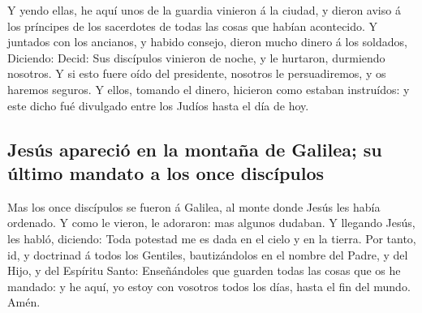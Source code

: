  Y yendo ellas, he aquí unos de la guardia vinieron á la
ciudad, y dieron aviso á los príncipes de los sacerdotes de todas las
cosas que habían acontecido.  Y juntados con los
ancianos, y habido consejo, dieron mucho dinero á los soldados,
 Diciendo: Decid: Sus discípulos vinieron de noche, y le
hurtaron, durmiendo nosotros.  Y si esto fuere oído del
presidente, nosotros le persuadiremos, y os haremos seguros.
 Y ellos, tomando el dinero, hicieron como estaban
instruídos: y este dicho fué divulgado entre los Judíos hasta el día de
hoy.

\hypertarget{jesuxfas-apareciuxf3-en-la-montauxf1a-de-galilea-su-uxfaltimo-mandato-a-los-once-discuxedpulos}{%
\subsection{Jesús apareció en la montaña de Galilea; su último mandato a
los once
discípulos}\label{jesuxfas-apareciuxf3-en-la-montauxf1a-de-galilea-su-uxfaltimo-mandato-a-los-once-discuxedpulos}}

 Mas los once discípulos se fueron á Galilea, al monte
donde Jesús les había ordenado.  Y como le vieron, le
adoraron: mas algunos dudaban.  Y llegando Jesús, les
habló, diciendo: Toda potestad me es dada en el cielo y en la tierra.
 Por tanto, id, y doctrinad á todos los Gentiles,
bautizándolos en el nombre del Padre, y del Hijo, y del Espíritu Santo:
 Enseñándoles que guarden todas las cosas que os he
mandado: y he aquí, yo estoy con vosotros todos los días, hasta el fin
del mundo. Amén.
